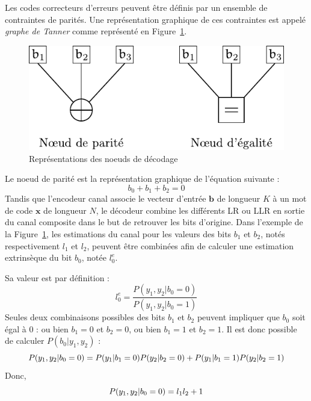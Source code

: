 Les codes correcteurs d'erreurs peuvent être définis par un ensemble de contraintes de parités. Une représentation graphique de ces contraintes est appelé \textit{graphe de Tanner} comme représenté en Figure~\ref{fig:noeuds}.

\begin{figure}[t]
\centering
\includegraphics{tail/appendix_1_fig/noeuds}
\caption{Représentations des noeuds de décodage}
\label{fig:noeuds}
\end{figure}

Le noeud de parité est la représentation graphique de l'équation suivante : 
\begin{equation}
b_0 + b_1 + b_2 = 0
\end{equation}
Tandis que l'encodeur canal associe le vecteur d'entrée $\mathbold{b}$ de longueur $K$ à un mot de code $\mathbold{x}$ de longueur $N$, le décodeur combine les différents LR ou LLR en sortie du canal composite dans le but de retrouver les bits d'origine.
Dans l'exemple de la Figure~\ref{fig:noeuds}, les estimations du canal pour les valeurs des bits $b_1$ et $b_2$, notés respectivement $l_1$ et $l_2$, peuvent être combinées afin de calculer une estimation extrinsèque du bit $b_0$, notée $l_0^e$.

Sa valeur est par définition :
\begin{equation}
l^e_0 = \dfrac{P(y_1,y_2 | b_0 = 0)}{P(y_1,y_2 | b_0 = 1)}
\label{eq:le0}
\end{equation}
Seules deux combinaisons possibles des bits $b_1$ et $b_2$ peuvent impliquer que $b_0$ soit égal à $0$ : ou bien $b_1=0$ et $b_2=0$, ou bien $b_1=1$ et $b_2=1$. Il est donc possible de calculer $P(b_0|y_1,y_2)$ : 
\begin{equation}
P(y_1,y_2 | b_0 = 0)  =  P(y_1 | b_1 = 0)P(y_2 | b_2 = 0) + P(y_1 | b_1 = 1)P(y_2 | b_2 = 1) \\
\end{equation}
Donc,  
\begin{equation}
P(y_1,y_2 | b_0 = 0)  =  l_1l_2 + 1 \\
\label{eq:le1}
\end{equation}


